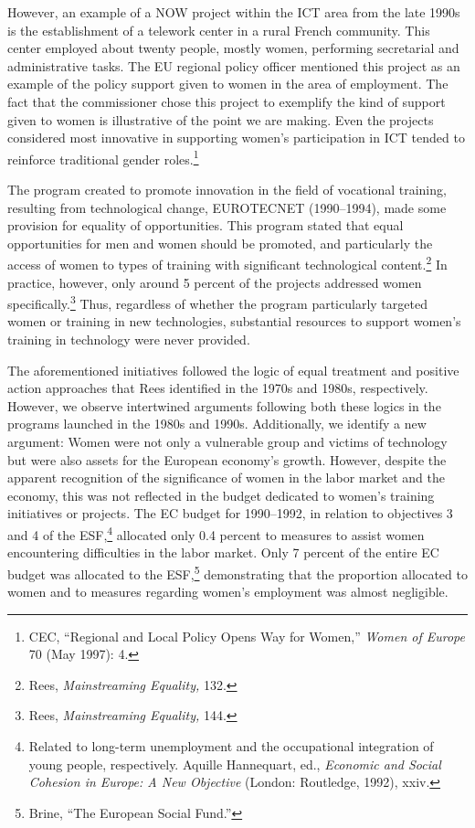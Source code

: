 \documentclass{tufte-handout}
\begin{document}
However, an example of a NOW project within the ICT area from the late
1990s is the establishment of a telework center in a rural French
community. This center employed about twenty people, mostly women,
performing secretarial and administrative tasks. The EU regional policy
officer mentioned this project as an example of the policy support given
to women in the area of employment. The fact that the commissioner chose
this project to exemplify the kind of support given to women is
illustrative of the point we are making. Even the projects considered
most innovative in supporting women's participation in ICT tended to
reinforce traditional gender roles.\footnote{CEC, ``Regional and Local
  Policy Opens Way for Women,'' \emph{Women of Europe} 70 (May 1997): 4.}

The program created to promote innovation in the field of vocational
training, resulting from technological change, EUROTECNET (1990--1994),
made some provision for equality of opportunities. This program stated
that equal opportunities for men and women should be promoted, and
particularly the access of women to types of training with significant
technological content.\footnote{Rees, \emph{Mainstreaming Equality,}
  132.} In practice, however, only around 5 percent of the projects
addressed women specifically.\footnote{Rees, \emph{Mainstreaming
  Equality,} 144.} Thus, regardless of whether the program particularly
targeted women or training in new technologies, substantial resources to
support women's training in technology were never provided.

The aforementioned initiatives followed the logic of equal treatment and
positive action approaches that Rees identified in the 1970s and 1980s,
respectively. However, we observe intertwined arguments following both
these logics in the programs launched in the 1980s and 1990s.
Additionally, we identify a new argument: Women were not only a
vulnerable group and victims of technology but were also assets for the
European economy's growth. However, despite the apparent recognition of
the significance of women in the labor market and the economy, this was
not reflected in the budget dedicated to women's training initiatives or
projects. The EC budget for 1990--1992, in relation to objectives 3 and
4 of the ESF,\footnote{Related to long-term unemployment and the
  occupational integration of young people, respectively. Aquille
  Hannequart, ed., \emph{Economic and Social Cohesion in Europe: A New
  Objective} (London: Routledge, 1992), xxiv.} allocated only 0.4
percent to measures to assist women encountering difficulties in the
labor market. Only 7 percent of the entire EC budget was allocated to
the ESF,\footnote{Brine, ``The European Social Fund.''} demonstrating
that the proportion allocated to women and to measures regarding women's
employment was almost negligible.
\end{document}
